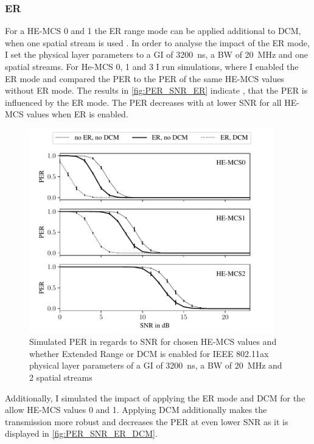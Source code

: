 \subsubsection*{\acf{ER}}
For a HE-MCS \num{0} and \num{1} the \ac{ER} range mode can be applied additional to \ac{DCM}, when one spatial stream is used \cite{noauthor_ieee_2021}.
In order to analyse the impact of the \ac{ER} mode, I set the physical layer parameters to a \ac{GI} of
\SI{3200}{\nano\second}, a \ac{BW} of \SI{20}{\mega\hertz} and one spatial streams. For He-MCS \num{0}, \num{1} and \num{3} I run simulations, where I enabled the
\ac{ER} mode and compared the \ac{PER} to the \ac{PER} of the same HE-MCS values without \ac{ER} mode.
The results in \autoref{fig:PER_SNR_ER} indicate , that the \ac{PER} is influenced by the \ac{ER} mode. The \ac{PER} decreases with at lower \ac{SNR} for all HE-MCS values
when \ac{ER} is enabled.
\begin{figure}%
	\centering
	\includegraphics[width=0.95\textwidth]{figures/ER_PER_to_SNR.pdf}
	\caption{Simulated \ac{PER} in regards to \ac{SNR} for chosen HE-\ac{MCS} values and whether Extended Range or \ac{DCM}
	is enabled for IEEE 802.11ax physical layer parameters of a \ac{GI} of \SI{3200}{\nano\second}, a \ac{BW} of \SI{20}{\mega\hertz} and 2 spatial streams}
	\label{fig:PER_SNR_ER}%
\end{figure}
Additionally, I simulated the impact of applying the \ac{ER} mode and \ac{DCM} for the allow HE-MCS values \num{0} and \num{1}.
Applying \ac{DCM} additionally makes the transmission more robust and decreases the \ac{PER} at even lower \ac{SNR} as
it is displayed in \autoref{fig:PER_SNR_ER_DCM}.

